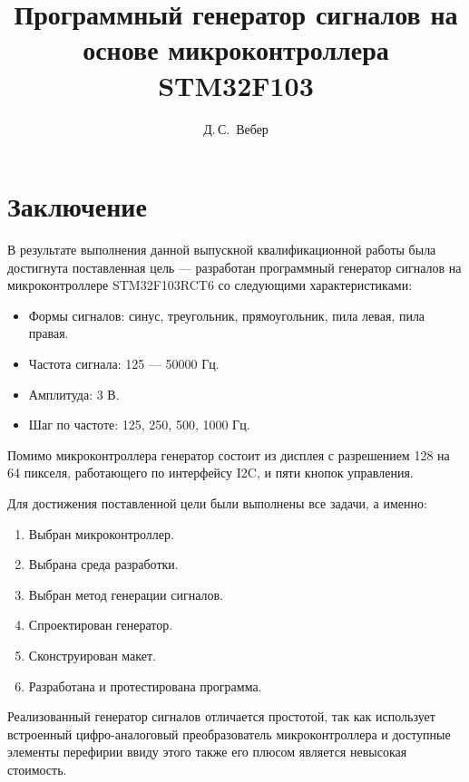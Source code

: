 \documentclass[14pt, oneside]{altsu-bachelor}
\title{Программный генератор сигналов на основе микроконтроллера STM32F103}
\author{Д.\,С.~Вебер}
\institute{Институт цифровых технологий, электроники и физики}
\date{\the\year}
\begin{document}
\maketitle

\setcounter{page}{2}
\makeabstract
\tableofcontents






\chapter*{Заключение}
В результате выполнения данной выпускной квалификационной работы была достигнута поставленная цель --- разработан программный генератор сигналов на микроконтроллере STM32F103RCT6 со следующими характеристиками:

\begin{itemize}
	\item Формы сигналов: синус, треугольник, прямоугольник, пила левая, пила правая.
	\item Частота сигнала: 125 --- 50000 Гц.
	\item Амплитуда: 3 В.
	\item Шаг по частоте: 125, 250, 500, 1000 Гц.
\end{itemize}

Помимо микроконтроллера генератор состоит из дисплея с разрешением 128 на 64 пикселя, работающего по интерфейсу I2C, и пяти кнопок управления.

Для достижения поставленной цели были выполнены все задачи, а именно:
\begin{enumerate}
	\item Выбран микроконтроллер.
	\item Выбрана среда разработки.
	\item Выбран метод генерации сигналов.
	\item Спроектирован генератор.
	\item Сконструирован макет.
	\item Разработана и протестирована программа.
\end{enumerate}

Реализованный генератор сигналов отличается простотой, так как использует встроенный цифро-аналоговый преобразователь микроконтроллера и доступные элементы перефирии ввиду этого также его плюсом является невысокая стоимость. 




\newpage
{}
\printbibliography[title={Список использованной литературы}]



\makelastpage
\end{document}
